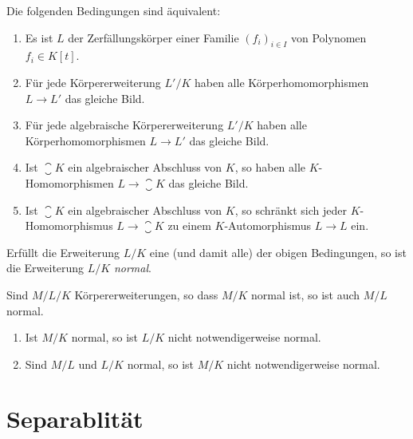 \begin{proposition}
  Die folgenden Bedingungen sind äquivalent:
  \begin{enumerate}
    \item
      Es ist $L$ der Zerfällungskörper einer Familie $(f_i)_{i \in I}$ von Polynomen $f_i \in K[t]$.
    \item
      Für jede Körpererweiterung $L'/K$ haben alle Körperhomomorphismen $L \to L'$ das gleiche Bild.
    \item
      Für jede algebraische Körpererweiterung $L'/K$ haben alle Körperhomomorphismen $L \to L'$ das gleiche Bild.
    \item
      Ist $\closure{K}$ ein algebraischer Abschluss von $K$, so haben alle $K$-Homomorphismen $L \to \closure{K}$ das gleiche Bild.
    \item
      Ist $\closure{K}$ ein algebraischer Abschluss von $K$, so schränkt sich jeder $K$-Homomorphismus $L \to \closure{K}$ zu einem $K$-Automorphismus $L \to L$ ein.
  \end{enumerate}
\end{proposition}

\begin{definition}
  Erfüllt die Erweiterung $L/K$ eine \textup(und damit alle\textup) der obigen Bedingungen, so ist die Erweiterung $L/K$ \emph{normal}.
\end{definition}

\begin{lemma}
  Sind $M/L/K$ Körpererweiterungen, so dass $M/K$ normal ist, so ist auch $M/L$ normal.
\end{lemma}

\begin{warning}
  \begin{enumerate}
    \item
      Ist $M/K$ normal, so ist $L/K$ nicht notwendigerweise normal.
    \item
      Sind $M/L$ und $L/K$ normal, so ist $M/K$ nicht notwendigerweise normal.
  \end{enumerate}
\end{warning}





\section{Separablität}









